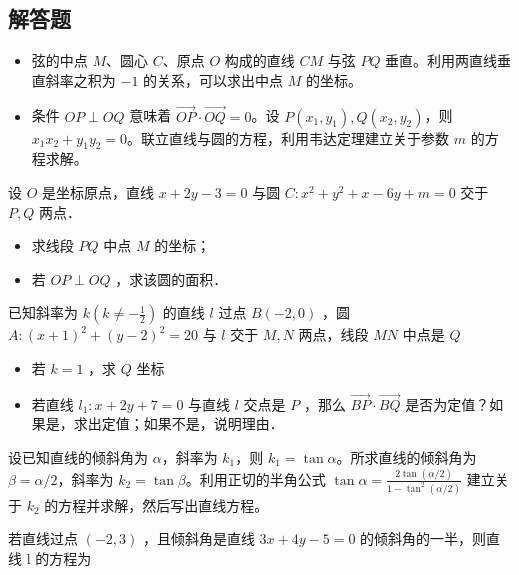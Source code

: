 \subsection{解答题}
\begin{theorem}[垂径定理与韦达定理]
    \begin{itemize}
        \item[(1)] 弦的中点 $M$、圆心 $C$、原点 $O$ 构成的直线 $CM$ 与弦 $PQ$ 垂直。利用两直线垂直斜率之积为 $-1$ 的关系，可以求出中点 $M$ 的坐标。
        \item[(2)] 条件 $OP \perp OQ$ 意味着 $\overrightarrow{OP} \cdot \overrightarrow{OQ} = 0$。设 $P(x_1, y_1), Q(x_2, y_2)$，则 $x_1x_2 + y_1y_2 = 0$。联立直线与圆的方程，利用韦达定理建立关于参数 $m$ 的方程求解。
    \end{itemize}
\end{theorem}
\begin{example}
    设 $O$ 是坐标原点，直线 $x+2 y-3=0$ 与圆 $C: x^2+y^2+x-6 y+m=0$ 交于 $P, Q$ 两点．
    \begin{itemize}
        \item[（1）] 求线段 $P Q$ 中点 $M$ 的坐标；
        \item[（2）] 若 $O P \perp O Q$ ，求该圆的面积．
    \end{itemize}
\end{example}

\vspace{4em}

\begin{example}
    已知斜率为 $k\left(k \neq-\frac{1}{2}\right)$ 的直线 $l$ 过点 $B(-2,0)$ ，圆 $A:(x+1)^2+(y-2)^2=20$ 与 $l$ 交于 $M, N$ 两点，线段 $M N$ 中点是 $Q$
    \begin{itemize}
        \item[（1）] 若 $k=1$ ，求 $Q$ 坐标
        \item[（2）] 若直线 $l_1: x+2 y+7=0$ 与直线 $l$ 交点是 $P$ ，那么 $\overrightarrow{B P} \cdot \overrightarrow{B Q}$ 是否为定值？如果是，求出定值；如果不是，说明理由．
    \end{itemize}
\end{example}

\vspace{4em}



\begin{theorem}[斜率与半角公式]
    设已知直线的倾斜角为 $\alpha$，斜率为 $k_1$，则 $k_1=\tan\alpha$。所求直线的倾斜角为 $\beta = \alpha/2$，斜率为 $k_2 = \tan\beta$。利用正切的半角公式 $\tan\alpha = \frac{2\tan(\alpha/2)}{1-\tan^2(\alpha/2)}$ 建立关于 $k_2$ 的方程并求解，然后写出直线方程。
\end{theorem}
\begin{example}
    若直线过点 $(-2,3)$ ，且倾斜角是直线 $3 x+4 y-5=0$ 的倾斜角的一半，则直线 l 的方程为 $\qquad$
\end{example}

